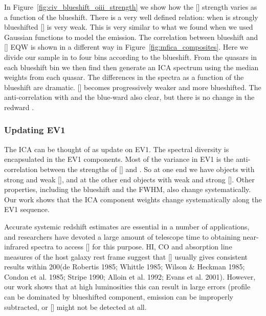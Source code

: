 In Figure~\ref{fig:civ_blueshift_oiii_strength} we show how the [] strength varies as a function of the  blueshift. 
There is a very well defined relation: when  is strongly blueshifted [] is very weak. 
This is very similar to what we found when we used Gaussian functions to model the emission. 
The correlation between  blueshift and [] EQW is shown in a different way in Figure~\ref{fig:mfica_composites}. 
Here we divide our sample in to four bins according to the  blueshift. 
From the quasars in each  blueshift bin we then find then generate an ICA spectrum using the median weights from each quasar. 
The differences in the spectra as a function of the  blueshift are dramatic. 
[] becomes progressively weaker and more blueshifted.
The anti-correlation with  and the blue-ward  also clear, but there is no change in the redward . 

\subsubsection{Updating EV1}

The ICA can be thought of as update on EV1. 
The spectral diversity is encapsulated in the EV1 components. 
Most of the variance in EV1 is the anti-correlation between the strengths of [] and . 
So at one end we have objects with strong  and weak [], and at the other end objects with weak  and strong []. 
Other properties, including the  blueshift and the \hb FWHM, also change systematically. 
Our work shows that the ICA component weights change systematically along the EV1 sequence. 


Accurate systemic redshift estimates are essential in a number of applications, and researchers have devoted a large amount of telescope time to obtaining near-infrared spectra to access [] for this purpose. 
HI, CO and absorption line measures of the host galaxy rest frame suggest that [] usually gives consistent results within 200\kms (de Robertis 1985; Whittle 1985; Wilson \& Heckman 1985; Condon et al. 1985; Stripe 1990; Alloin et al. 1992; Evans et al. 2001).  
However, our work shows that at high luminosities this can result in large errors (profile can be dominated by blueshifted component,  emission can be improperly subtracted, or [] might not be detected at all. 



